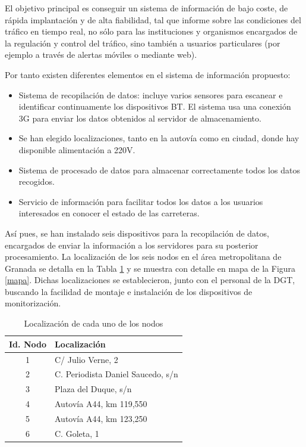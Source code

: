 \documentclass[twocolumn,twoside]{Jornadas}
\begin{document}
El objetivo principal es conseguir un sistema de información de bajo coste, de rápida implantación y de alta fiabilidad, tal que informe sobre las 
condiciones del tráfico en tiempo real, no sólo para las instituciones y organismos encargados de la regulación y control del tráfico, 
sino también a usuarios particulares (por ejemplo a través de alertas móviles o mediante web). 

Por tanto existen diferentes elementos en el sistema de información propuesto:

\begin{itemize}

  \item Sistema de recopilación de datos: incluye varios sensores para escanear e identificar continuamente los dispositivos BT. El sistema usa una conexión 3G para enviar los datos obtenidos al servidor de almacenamiento.
  
  \item Se han elegido localizaciones, tanto en la autovía como en ciudad, donde hay disponible alimentación a 220V.

  \item Sistema de procesado de datos para almacenar correctamente todos los datos recogidos.

  \item Servicio de información para facilitar todos los datos a los usuarios interesados en conocer el estado de las carreteras.

\end{itemize}

Así pues, se han instalado seis dispositivos para la recopilación de datos, encargados de enviar la información a los servidores para su posterior procesamiento. 
La localización de los seis nodos en el área metropolitana de Granada se detalla en la Tabla \ref{localizaciones} y se muestra con detalle en mapa de la Figura \ref{mapa}.
Dichas localizaciones se establecieron, junto con el personal de la DGT, buscando la facilidad de montaje e instalación de los dispositivos de monitorización.

 \begin{table}
 \caption{Localización de cada uno de los nodos
 \label{localizaciones}}
 \begin{center}
 \begin{tabular}{|c|l|}
 \hline
Id. Nodo  &  Localización      \\
 \hline
    1     &  C/ Julio Verne, 2    \\
 \hline
    2     &  C. Periodista Daniel Saucedo, s/n    \\
 \hline
    3     &  Plaza del Duque, s/n    \\
 \hline
    4     &  Autovía A44, km 119,550    \\
 \hline
    5     &  Autovía A44, km 123,250    \\
 \hline
    6     &  C. Goleta, 1    \\
 \hline
 \end{tabular}
 \end{center}
 \end{table}
\end{document}
